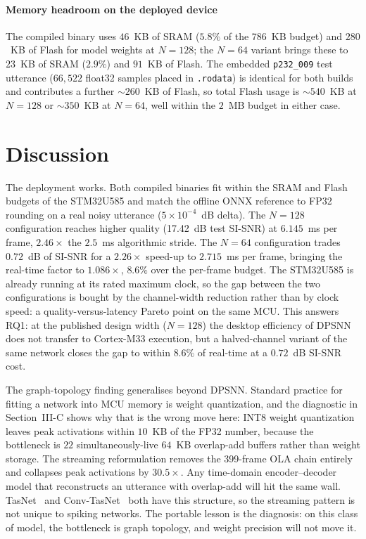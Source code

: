 \documentclass[conference]{IEEEtran}
\begin{document}
\paragraph{Memory headroom on the deployed device} The compiled binary uses $46$~KB of SRAM ($5.8\%$ of the $786$~KB budget) and $280$~KB of Flash for model weights at $N=128$; the $N=64$ variant brings these to $23$~KB of SRAM ($2.9\%$) and $91$~KB of Flash. The embedded \texttt{p232\_009} test utterance ($66{,}522$ float32 samples placed in \texttt{.rodata}) is identical for both builds and contributes a further ${\sim}260$~KB of Flash, so total Flash usage is ${\sim}540$~KB at $N=128$ or ${\sim}350$~KB at $N=64$, well within the $2$~MB budget in either case.




\section{Discussion}

The deployment works. Both compiled binaries fit within the SRAM and Flash budgets of the STM32U585 and match the offline ONNX reference to FP32 rounding on a real noisy utterance ($5 \times 10^{-4}$~dB delta). The $N=128$ configuration reaches higher quality (17.42~dB test SI-SNR) at $6.145$~ms per frame, $2.46\times$ the $2.5$~ms algorithmic stride. The $N=64$ configuration trades $0.72$~dB of SI-SNR for a $2.26\times$ speed-up to $2.715$~ms per frame, bringing the real-time factor to $1.086\times$, $8.6\%$ over the per-frame budget. The STM32U585 is already running at its rated maximum clock, so the gap between the two configurations is bought by the channel-width reduction rather than by clock speed: a quality-versus-latency Pareto point on the same MCU. This answers RQ1: at the published design width ($N=128$) the desktop efficiency of DPSNN does not transfer to Cortex-M33 execution, but a halved-channel variant of the same network closes the gap to within $8.6\%$ of real-time at a $0.72$~dB SI-SNR cost.

The graph-topology finding generalises beyond DPSNN. Standard practice for fitting a network into MCU memory is weight quantization, and the diagnostic in Section~III-C shows why that is the wrong move here: INT8 weight quantization leaves peak activations within $10$~KB of the FP32 number, because the bottleneck is $22$ simultaneously-live $64$~KB overlap-add buffers rather than weight storage. The streaming reformulation removes the 399-frame OLA chain entirely and collapses peak activations by $30.5\times$. Any time-domain encoder--decoder model that reconstructs an utterance with overlap-add will hit the same wall. TasNet~\cite{b2} and Conv-TasNet~\cite{b3} both have this structure, so the streaming pattern is not unique to spiking networks. The portable lesson is the diagnosis: on this class of model, the bottleneck is graph topology, and weight precision will not move it.
\end{document}
